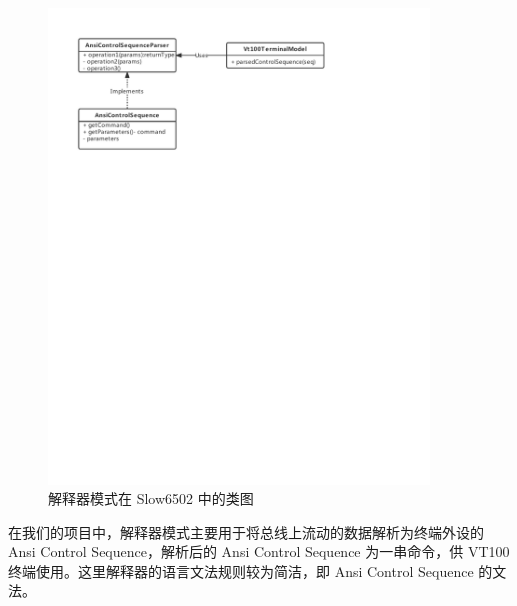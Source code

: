 \begin{figure}[h]
    \centering
    \includegraphics[width=0.9\textwidth]{figures/Interpreter.pdf}
    \caption{解释器模式在 Slow6502 中的类图}
\end{figure}

在我们的项目中，解释器模式主要用于将总线上流动的数据解析为终端外设的 Ansi Control Sequence，解析后的 Ansi Control Sequence 为一串命令，供 VT100 终端使用。这里解释器的语言文法规则较为简洁，即 Ansi Control Sequence 的文法。
